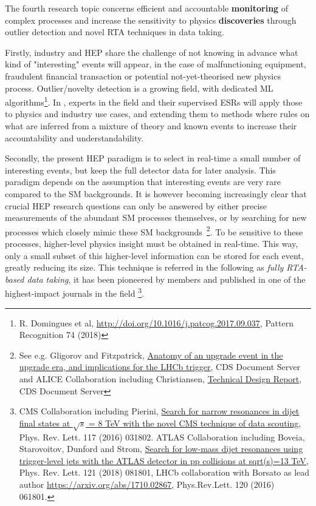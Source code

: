 The fourth research topic concerns efficient and accountable \textbf{monitoring} of complex processes and increase the sensitivity to physics \textbf{discoveries} through outlier detection and novel RTA techniques in data taking. 

Firstly, industry and HEP share the challenge of not knowing in advance what kind of "interesting" events will appear, in the case of malfunctioning equipment, fraudulent financial transaction or potential not-yet-theorised new physics process. 
Outlier/novelty detection is a growing field, with dedicated ML algorithms\footnote{R. Domingues et al, \href{A comparative evaluation of outlier detection algorithms: experiments and analyses}{http://doi.org/10.1016/j.patcog.2017.09.037}, Pattern Recognition 74 (2018)}. In \acronym, experts in the field and their supervised ESRs will apply those to physics and industry use cases, and extending them to methods where rules on what are inferred from a mixture of theory and known events to increase their accountability and understandability.

Secondly, the present HEP paradigm is to select in real-time a small number of interesting events, but keep the full detector data for later analysis. This paradigm depends on the assumption that interesting events are very rare compared to the SM backgrounds. It is however becoming increasingly clear that crucial HEP research questions can only be answered by either precise measurements of the abundant SM processes themselves, or by searching for new processes which closely mimic these SM backgrounds~\footnote{See e.g. Gligorov and Fitzpatrick, \href{http://cds.cern.ch/record/1670985}{Anatomy of an upgrade event in the upgrade era, and implications for the LHCb trigger}, CDS Document Server and ALICE Collaboration including Christiansen, \href{https://cds.cern.ch/record/2011297/files/ALICE-TDR-019.pdf}{Technical Design Report}, CDS Document Server}. To be sensitive to these processes, higher-level physics insight must be obtained in real-time. This way, only a small subset of this higher-level information can be stored for each event, greatly reducing its size. This technique is referred in the following as \textit{fully RTA-based data taking}, it has been pioneered by \acronym members and published in one of the highest-impact journals in the field
\footnote{CMS Collaboration including Pierini, \href{https://arxiv.org/abs/1604.08907}{Search for narrow resonances in dijet final states at $\sqrt{s}$ = 8 TeV with the novel CMS technique of data scouting}, Phys. Rev. Lett. 117 (2016) 031802. ATLAS Collaboration including Boveia, Starovoitov, Dunford and Strom, \href{https://arxiv.org/abs/1804.03496}{Search for low-mass dijet resonances using trigger-level jets with the ATLAS detector in pp collisions at sqrt(s)=13 TeV}, Phys. Rev. Lett. 121 (2018) 081801, LHCb collaboration with Borsato as lead author \href{LHCb Collaboration: Search for dark photons produced in 13 TeV pp collisions}{https://arxiv.org/abs/1710.02867}, Phys.Rev.Lett. 120 (2016) 061801.}.

